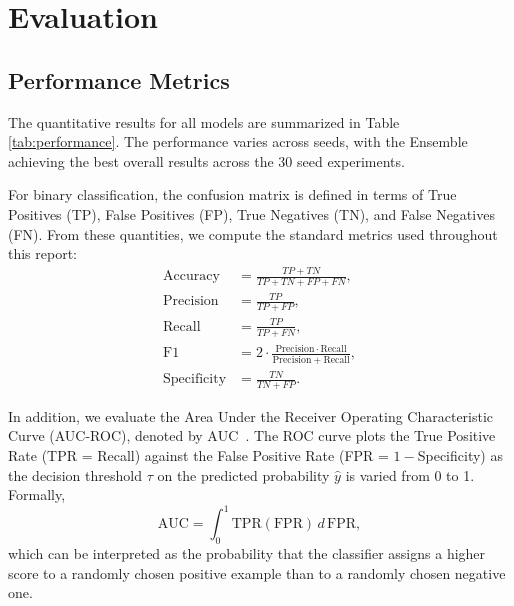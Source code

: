 \documentclass[12pt,a4paper]{article}
\newcommand{\Recall}{\ensuremath{\mathrm{Recall}}}
\newcommand{\Precision}{\mathrm{Precision}}
\newcommand{\Fone}{\mathrm{F1}}
\newcommand{\AUC}{\ensuremath{\mathrm{AUC}}}
\newcommand{\Accuracy}{\mathrm{Accuracy}}
\begin{document}
\section{Evaluation}

\subsection{Performance Metrics}
The quantitative results for all models are summarized in Table \ref{tab:performance}. The performance varies across seeds, with the Ensemble achieving the best overall results across the 30 seed experiments.

For binary classification, the confusion matrix is defined in terms of True Positives (TP), False Positives (FP), True Negatives (TN), and False Negatives (FN). From these quantities, we compute the standard metrics used throughout this report:
\begin{align}
    \Accuracy &= \frac{TP + TN}{TP + TN + FP + FN}, \\
    \Precision &= \frac{TP}{TP + FP}, \\
    \Recall &= \frac{TP}{TP + FN}, \\
    \Fone &= 2 \cdot \frac{\Precision \cdot \Recall}{\Precision + \Recall}, \\
    \text{Specificity} &= \frac{TN}{TN + FP}.
\end{align}

In addition, we evaluate the Area Under the Receiver Operating Characteristic Curve (AUC-ROC), denoted by \AUC\ \citep{montgomery2020introduction}. The ROC curve plots the True Positive Rate (TPR = Recall) against the False Positive Rate (FPR = $1-$Specificity) as the decision threshold $\tau$ on the predicted probability $\hat{y}$ is varied from 0 to 1. Formally,
\begin{equation}
    \AUC = \int_{0}^{1} \text{TPR}(\text{FPR}) \, d\,\text{FPR},
\end{equation}
which can be interpreted as the probability that the classifier assigns a higher score to a randomly chosen positive example than to a randomly chosen negative one.
\end{document}
